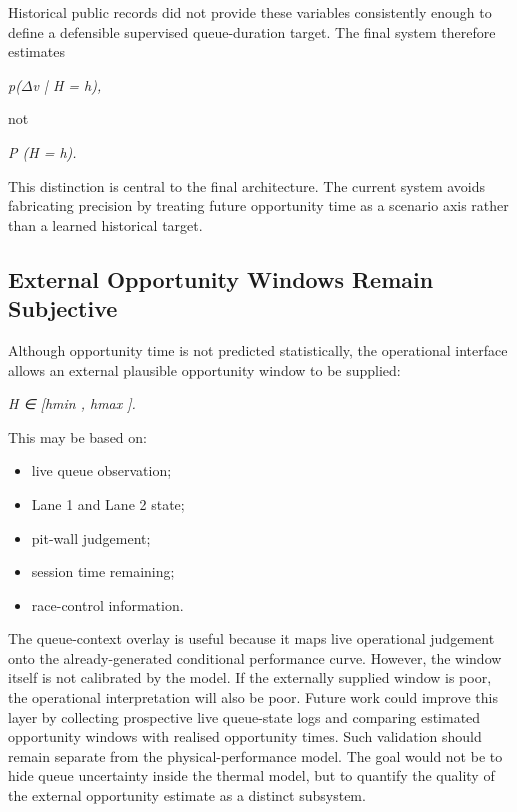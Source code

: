 Historical public records did not provide these variables consistently enough to define a defensible supervised queue-duration target. The final system therefore estimates

\begin{center}\textit{p(\ensuremath{\Delta}v | H = h),}\end{center}

not

\begin{center}\textit{P (H = h).}\end{center}

This distinction is central to the final architecture. The current system avoids fabricating precision by treating future opportunity time as a scenario axis rather than a learned historical target.

\subsection{External Opportunity Windows Remain Subjective}
Although opportunity time is not predicted statistically, the operational interface allows an external plausible opportunity window to be supplied:

\begin{center}\textit{H ∈ [hmin , hmax ].}\end{center}

This may be based on:

\begin{itemize}
\item live queue observation;
\item Lane 1 and Lane 2 state;
\item pit-wall judgement;
\item session time remaining;
\item race-control information.
\end{itemize}

The queue-context overlay is useful because it maps live operational judgement onto the already-generated conditional performance curve. However, the window itself is not calibrated by the model. If the externally supplied window is poor, the operational interpretation will also be poor. Future work could improve this layer by collecting prospective live queue-state logs and comparing estimated opportunity windows with realised opportunity times. Such validation should remain separate from the physical-performance model. The goal would not be to hide queue uncertainty inside the thermal model, but to quantify the quality of the external opportunity estimate as a distinct subsystem.

